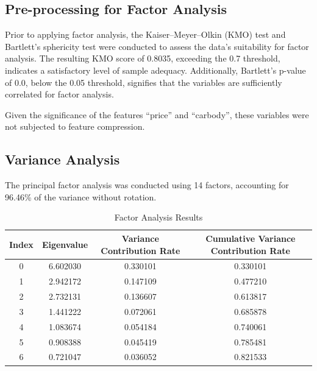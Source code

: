 \documentclass{article}
\begin{document}
\subsection{Pre-processing for Factor Analysis}
Prior to applying factor analysis, the Kaiser–Meyer–Olkin (KMO) test and Bartlett's sphericity test were conducted to assess the data's suitability for factor analysis.
The resulting KMO score of 0.8035, exceeding the 0.7 threshold, indicates a satisfactory level of sample adequacy.
Additionally, Bartlett's p-value of 0.0, below the 0.05 threshold, signifies that the variables are sufficiently correlated for factor analysis.

Given the significance of the features ``price'' and ``carbody'', these variables were not subjected to feature compression.

\subsection{Variance Analysis}
The principal factor analysis was conducted using 14 factors, accounting for 96.46\% of the variance without rotation.

\begin{table}[H]
    \centering
    \caption{Factor Analysis Results}
    \small
    \begin{tabular}{cccc}
        \toprule
        \textbf{Index} & \textbf{Eigenvalue} & \textbf{Variance Contribution Rate} & \textbf{Cumulative Variance Contribution Rate} \\
        \midrule
        0              & 6.602030            & 0.330101                            & 0.330101                                       \\
        1              & 2.942172            & 0.147109                            & 0.477210                                       \\
        2              & 2.732131            & 0.136607                            & 0.613817                                       \\
        3              & 1.441222            & 0.072061                            & 0.685878                                       \\
        4              & 1.083674            & 0.054184                            & 0.740061                                       \\
        5              & 0.908388            & 0.045419                            & 0.785481                                       \\
        6              & 0.721047            & 0.036052                            & 0.821533                                       \\
        \bottomrule
    \end{tabular}
\end{table}
\end{document}
